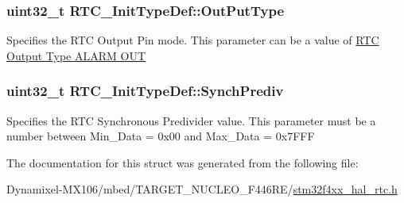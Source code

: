 \subsubsection[{\texorpdfstring{Out\+Put\+Type}{OutPutType}}]{\setlength{\rightskip}{0pt plus 5cm}uint32\+\_\+t R\+T\+C\+\_\+\+Init\+Type\+Def\+::\+Out\+Put\+Type}\hypertarget{struct_r_t_c___init_type_def_a2c4a2bd3cfae39882e657e653e45185a}{}\label{struct_r_t_c___init_type_def_a2c4a2bd3cfae39882e657e653e45185a}
Specifies the R\+TC Output Pin mode. This parameter can be a value of \hyperlink{group___r_t_c___output___type___a_l_a_r_m___o_u_t}{R\+TC Output Type A\+L\+A\+RM O\+UT} 
\subsubsection[{\texorpdfstring{Synch\+Prediv}{SynchPrediv}}]{\setlength{\rightskip}{0pt plus 5cm}uint32\+\_\+t R\+T\+C\+\_\+\+Init\+Type\+Def\+::\+Synch\+Prediv}\hypertarget{struct_r_t_c___init_type_def_ac27c42530b6ba86654ec476cd0d020fb}{}\label{struct_r_t_c___init_type_def_ac27c42530b6ba86654ec476cd0d020fb}
Specifies the R\+TC Synchronous Predivider value. This parameter must be a number between Min\+\_\+\+Data = 0x00 and Max\+\_\+\+Data = 0x7\+F\+FF 

The documentation for this struct was generated from the following file\+:\begin{DoxyCompactItemize}
\item 
Dynamixel-\/\+M\+X106/mbed/\+T\+A\+R\+G\+E\+T\+\_\+\+N\+U\+C\+L\+E\+O\+\_\+\+F446\+R\+E/\hyperlink{stm32f4xx__hal__rtc_8h}{stm32f4xx\+\_\+hal\+\_\+rtc.\+h}\end{DoxyCompactItemize}
